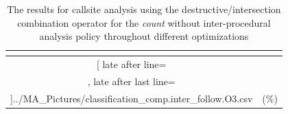 \begin{table}[!htbp]
{\begin{tabular}{|c|c}
\multicolumn{1}{c}{}
	\\\midrule
	\csvreader[ late after line=\\, late after last line=\\\bottomrule]{../MA_Pictures/classification_comp.inter_follow.O3.csv}{
}
	{\csvcoliv (\csvcolv \%) & \csvcolvi (\csvcolvii\%)}%


    	\end{tabular}
}
		\caption {The results for callsite analysis using the destructive/intersection combination operator for the \textit{count} without inter-procedural analysis policy throughout different optimizations}
		\label{tbl:CSdestinterCOUNTnointer}
\end{table}


